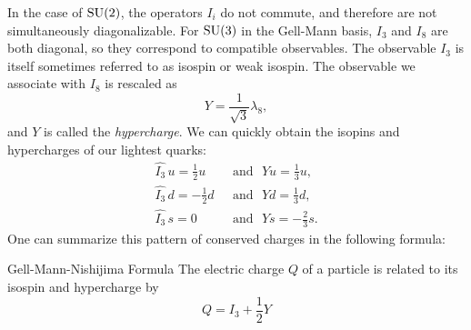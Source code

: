 In the case of $\operatorname{SU}(2)$, the operators $I_i$ do not commute, and therefore are
not simultaneously diagonalizable. For $\operatorname{SU}(3)$ in the Gell-Mann basis,
$I_3$ and $I_8$ are both diagonal, so they correspond to compatible
observables. The observable $I_3$ is itself sometimes referred to
as isospin or weak isospin. The observable we associate with $I_8$ is rescaled as
\begin{equation}
  Y=\frac{1}{\sqrt{3}}\lambda_8,
\end{equation}
and $Y$ is called the {\it hypercharge}. 
We can quickly obtain the isopins and hypercharges of
our lightest quarks: 
\begin{equation}\begin{aligned}
\hat{I_3}\,u =\frac{1}{2}u ~~~ &\text{and}~~~\hat{Y}u=\frac{1}{3}u,\\
\hat{I_3}\,d =-\frac{1}{2}d ~~~ &\text{and}~~~\hat{Y}d=\frac{1}{3}d,\\
\hat{I_3}\,s = 0           ~~~ &\text{and}~~~\hat{Y}s=-\frac{2}{3}s.
\end{aligned}\end{equation}
One can summarize this pattern of conserved charges in the following formula:
\begin{theorem}{Gell-Mann-Nishijima Formula}{}
  The electric charge $Q$ of a particle is related to its isospin and
  hypercharge by
  \begin{equation*}
    Q=I_3+\frac{1}{2}Y
  \end{equation*}
\end{theorem}

